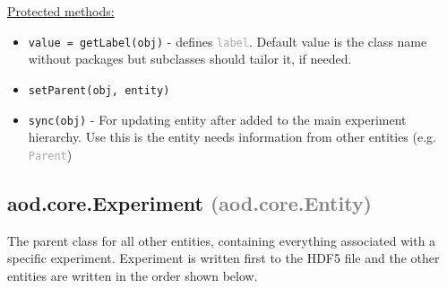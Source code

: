 \documentclass[10pt]{exam}
\newcommand\myparent[1]{\textcolor{gray}{(#1)}}
\newcommand\aodprop[1]{\textcolor{darkgray}{\texttt{#1}}}
\newcommand\aodfcn[1]{\textcolor{darkteal}{\texttt{#1}}}
\newcommand\docheader[1]{\vspace{0.6ex}\noindent\underline{#1}\vspace{0.15ex}}
\begin{document}
		\docheader{Protected methods:}
		\begin{itemize}
			\item \aodfcn{value = getLabel(obj)} - defines \aodprop{label}. Default value is the class name without packages but subclasses should tailor it, if needed.
			\item \aodfcn{setParent(obj, entity)}
			\item \aodfcn{sync(obj)} - For updating entity after added to the main experiment hierarchy. Use this is the entity needs information from other entities (e.g. \aodprop{Parent})
		\end{itemize}
			
	\subsection{aod.core.Experiment  \myparent{aod.core.Entity}}
		\noindent The parent class for all other entities, containing everything associated with a specific experiment. Experiment is written first to the HDF5 file and the other entities are written in the order shown below.
			
\end{document}

